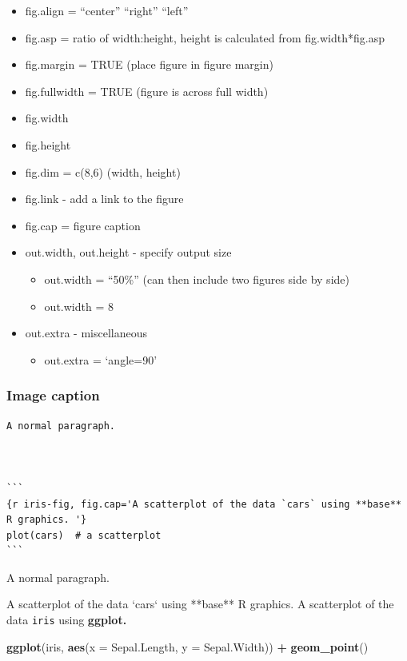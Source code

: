 \documentclass[
]{book}
\newenvironment{Shaded}{\begin{snugshade}}{\end{snugshade}}
\newcommand{\DataTypeTok}[1]{\textcolor[rgb]{0.13,0.29,0.53}{#1}}
\newcommand{\KeywordTok}[1]{\textcolor[rgb]{0.13,0.29,0.53}{\textbf{#1}}}
\newcommand{\NormalTok}[1]{#1}
\newcommand{\OperatorTok}[1]{\textcolor[rgb]{0.81,0.36,0.00}{\textbf{#1}}}
\newcommand{\StringTok}[1]{\textcolor[rgb]{0.31,0.60,0.02}{#1}}
\providecommand{\tightlist}{%
  \setlength{\itemsep}{0pt}\setlength{\parskip}{0pt}}
\begin{document}
\begin{itemize}
\tightlist
\item
  fig.align = ``center'' ``right'' ``left''
\item
  fig.asp = ratio of width:height, height is calculated from fig.width*fig.asp
\item
  fig.margin = TRUE (place figure in figure margin)
\item
  fig.fullwidth = TRUE (figure is across full width)
\item
  fig.width
\item
  fig.height
\item
  fig.dim = c(8,6) (width, height)
\item
  fig.link - add a link to the figure
\item
  fig.cap = figure caption
\item
  out.width, out.height - specify output size

  \begin{itemize}
  \tightlist
  \item
    out.width = ``50\%'' (can then include two figures side by side)
  \item
    out.width = 8
  \end{itemize}
\item
  out.extra - miscellaneous

  \begin{itemize}
  \tightlist
  \item
    out.extra = `angle=90'
  \end{itemize}
\end{itemize}

\hypertarget{image-caption}{%
\subsubsection{Image caption}\label{image-caption}}

\begin{verbatim}
A normal paragraph.



```
{r iris-fig, fig.cap='A scatterplot of the data `cars` using **base** R graphics. '}
plot(cars)  # a scatterplot
```
\end{verbatim}

A normal paragraph.

A scatterplot of the data `cars` using **base** R graphics.  A scatterplot of the data \texttt{iris} using \textbf{ggplot.}

\begin{Shaded}
\begin{Highlighting}[]
\KeywordTok{ggplot}\NormalTok{(iris, }\KeywordTok{aes}\NormalTok{(}\DataTypeTok{x =}\NormalTok{ Sepal.Length, }\DataTypeTok{y =}\NormalTok{ Sepal.Width)) }\OperatorTok{+}\StringTok{ }\KeywordTok{geom\_point}\NormalTok{()}
\end{Highlighting}
\end{Shaded}
\end{document}
